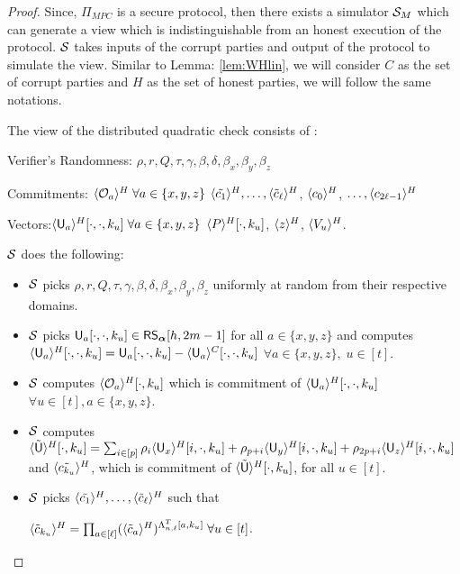 \begin{proof}
	Since, $\Pi_{MPC}$ is a secure protocol, then there exists a simulator $\mathcal{S}_{M}$ which can generate a view which is indistinguishable from an honest execution of the protocol. $\mathcal{S}$ takes inputs of the corrupt parties and output of the protocol to simulate the view. Similar to Lemma: \ref{lem:WHlin}, we will consider $C$ as the set of corrupt parties and $H$ as the set of honest parties, we will follow the same notations. 
	
	The view of the distributed quadratic check consists of :
	
	Verifier's Randomness: $\rho, r, Q, \tau, \gamma, \beta, \delta, \beta_x, \beta_y, \beta_z$
	
	Commitments: $\langle{\mathcal{O}_a}\rangle^H\; \forall a\in \{x,y,z\}$ $\langle{\tilde{c_1}}\rangle^H, \ldots, \langle{\tilde{c}_{\ell}}\rangle^H$, $\langle{c_0}\rangle^H$, $\ldots, \langle{c_{2\ell-1}}\rangle^H$
	
	Vectors:$\langle{\mathsf{U}_a}\rangle^H[\cdot,\cdot,k_u] \; \forall a\in\{x,y,z\}$ $ \langle{P}\rangle^H[\cdot,k_u]$, $\langle{z}\rangle^H$, $\langle{V_u}\rangle^H$.
	
	$\mathcal{S}$ does the following:
	\begin{itemize}
		\item $\mathcal{S}$ picks $\rho, r, Q, \tau, \gamma, \beta, \delta, \beta_x, \beta_y, \beta_z$ uniformly at random from their respective domains.
		
		\item $\mathcal{S}$ picks $\mathsf{U}_a[\cdot,\cdot, k_u]\in \mathsf{RS}_{\bm{\alpha}}[h,2m-1]$ for all $a\in\{x,y,z\}$  and computes $\langle{\mathsf{U}_a}\rangle^H[\cdot,\cdot,k_u]= \mathsf{U}_a[\cdot, \cdot, k_u] - \langle{\mathsf{U}_a}\rangle^C[\cdot, \cdot, k_u]$ $\forall a\in\{x,y,z\},\; u\in[t]$.
		
		\item $\mathcal{S}$ computes $\langle{\mathcal{O}_a}\rangle^H[\cdot,k_u]$ which is commitment of $\langle{\mathsf{U}_a}\rangle^H[\cdot, \cdot,k_u]$ $\forall u\in[t], a\in\{x,y,z\}$.
		
		\item $\mathcal{S}$ computes $\langle{\tilde{\mathsf{U}}}\rangle^H[\cdot,k_u]=\sum_{i\in[p]} \rho_i \langle{\mathsf{U}_x}\rangle^H[i,\cdot,k_u]+ \rho_{p+i} \langle{\mathsf{U}_y}\rangle^H[i,\cdot,k_u]+ \rho_{2p+i} \langle{\mathsf{U}_z}\rangle^H[i,\cdot,k_u]$ and $\langle{\tilde{c_{k_u}}}\rangle^H$, which is commitment of $\langle{\tilde{\mathsf{U}}}\rangle^H[\cdot,k_u]$, for all $u\in [t]$.
		
		\item $\mathcal{S}$ picks $\langle{\tilde{c_1}}\rangle^H, \ldots, \langle{\tilde{c}_{\ell}}\rangle^H$ such that 
		
		$\langle{\tilde{c}_{k_u}}\rangle^H = \prod_{a\in[\ell]} (\langle{\tilde{c}_{a}}\rangle^H)^{\Lambda_{n,\ell}^T[a,k_u]} \; \forall u\in[t]$.
		

\end{itemize}
\end{proof}

